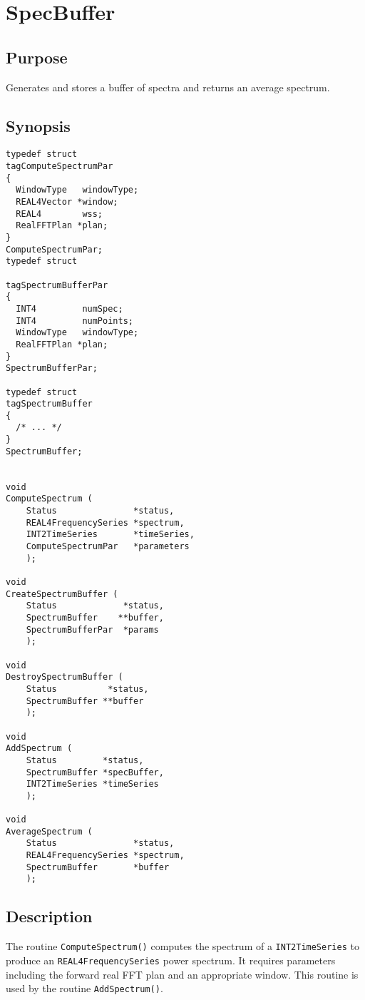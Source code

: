\documentclass{article}
\begin{document}
\section{SpecBuffer}

\subsection{Purpose}

Generates and stores a buffer of spectra and returns an average spectrum.

\subsection{Synopsis}

\begin{verbatim}
typedef struct
tagComputeSpectrumPar
{
  WindowType   windowType;
  REAL4Vector *window;
  REAL4        wss;
  RealFFTPlan *plan;
}
ComputeSpectrumPar;
typedef struct

tagSpectrumBufferPar
{
  INT4         numSpec;
  INT4         numPoints;
  WindowType   windowType;
  RealFFTPlan *plan;
}
SpectrumBufferPar;

typedef struct
tagSpectrumBuffer
{
  /* ... */
}
SpectrumBuffer;


void
ComputeSpectrum (
    Status               *status,
    REAL4FrequencySeries *spectrum,
    INT2TimeSeries       *timeSeries,
    ComputeSpectrumPar   *parameters
    );

void
CreateSpectrumBuffer (
    Status             *status,
    SpectrumBuffer    **buffer,
    SpectrumBufferPar  *params
    );

void
DestroySpectrumBuffer (
    Status          *status,
    SpectrumBuffer **buffer
    );

void
AddSpectrum (
    Status         *status,
    SpectrumBuffer *specBuffer,
    INT2TimeSeries *timeSeries
    );

void
AverageSpectrum (
    Status               *status,
    REAL4FrequencySeries *spectrum,
    SpectrumBuffer       *buffer
    );
\end{verbatim}

\subsection{Description}

The routine \texttt{ComputeSpectrum()} computes the spectrum of a
\texttt{INT2TimeSeries} to produce an \texttt{REAL4FrequencySeries} power
spectrum.  It requires parameters including the forward real FFT plan and an
appropriate window.  This routine is used by the routine
\texttt{AddSpectrum()}.
\end{document}
